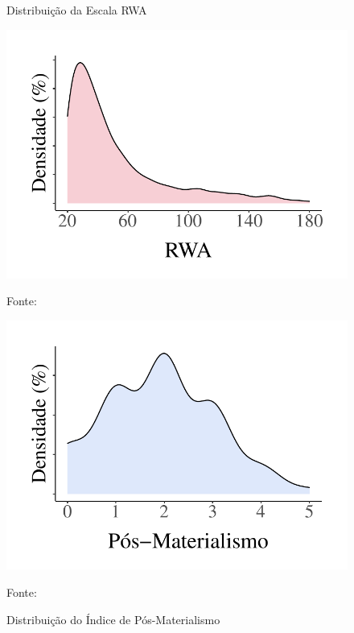 \documentclass[
12pt,				%
openright,			%
twoside,			%
a4paper,			%
english,			%
french,				%
spanish,			%
brazil				%
]{abntex2}
\begin{document}
\begin{figure}[!htb]
	\centering
	\begin{minipage}[b]{0.4\textwidth}
		\caption{Distribuição da Escala RWA}
		\label{fig:rwa}
		\centering
		\includegraphics[width=1\linewidth]{figures/distribuicao_rwa}
		
		Fonte: 
	\end{minipage}
	\hspace{.05\linewidth}
	\begin{minipage}[b]{0.4\textwidth}
		\caption{Distribuição do Índice de Pós-Materialismo}
		\label{fig:pos_mat}
		\centering
		\includegraphics[width=1\linewidth]{figures/pos_materialism_index}
		
		Fonte: 
	\end{minipage}
\end{figure}
\end{document}
